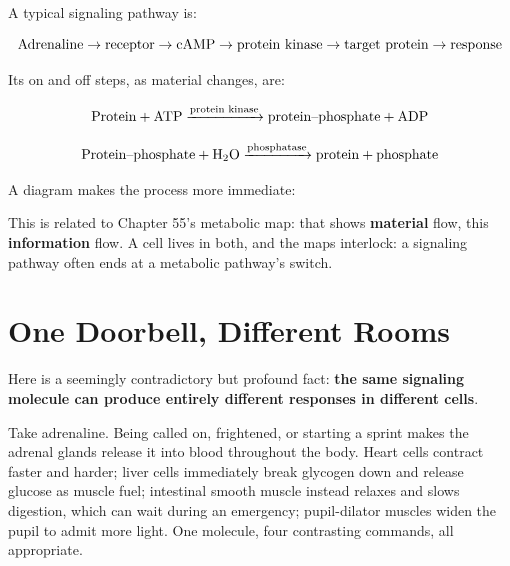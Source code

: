 A typical signaling pathway is:

\[\text{Adrenaline} \rightarrow \text{receptor} \rightarrow \mathrm{cAMP} \rightarrow \text{protein kinase} \rightarrow \text{target protein} \rightarrow \text{response}\]

Its on and off steps, as material changes, are:

\[\text{Protein} + \mathrm{ATP} \xrightarrow{\text{protein kinase}} \text{protein--phosphate} + \mathrm{ADP}\]

\[\text{Protein--phosphate} + \mathrm{H_2O} \xrightarrow{\text{phosphatase}} \text{protein} + \text{phosphate}\]

A diagram makes the process more immediate:

\begin{center}
\end{center}

This is related to Chapter 55's metabolic map: that shows \textbf{material} flow, this \textbf{information} flow. A cell lives in both, and the maps interlock: a signaling pathway often ends at a metabolic pathway's switch.

\section{One Doorbell, Different Rooms}

Here is a seemingly contradictory but profound fact: \textbf{the same signaling molecule can produce entirely different responses in different cells}.

Take adrenaline. Being called on, frightened, or starting a sprint makes the adrenal glands release it into blood throughout the body. Heart cells contract faster and harder; liver cells immediately break glycogen down and release glucose as muscle fuel; intestinal smooth muscle instead relaxes and slows digestion, which can wait during an emergency; pupil-dilator muscles widen the pupil to admit more light. One molecule, four contrasting commands, all appropriate.

